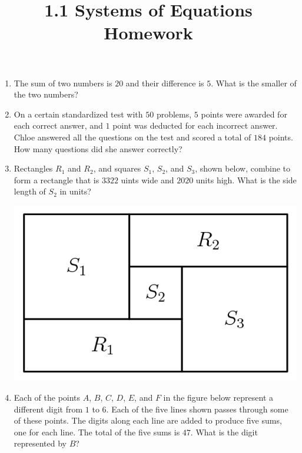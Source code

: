 \documentclass{article}
\title{1.1 Systems of Equations Homework}
\author{}
\date{}
\begin{document}
\maketitle
\begin{enumerate}
    \item The sum of two numbers is $20$ and their difference is $5$.
        What is the smaller of the two numbers?
        \vspace{3cm}
    \item On a certain standardized test with $50$ problems, $5$ points were awarded for each correct answer, and $1$ point was deducted for each incorrect answer.
        Chloe answered all the questions on the test and scored a total of $184$ points.
        How many questions did she answer correctly?
        \vspace{3cm}
    \item Rectangles $R_1$ and $R_2$, and squares $S_1$, $S_2$, and $S_3$, shown below, combine to form a rectangle that is $3322$ uints wide and $2020$ units high.
        What is the side length of $S_2$ in units?
        \begin{center}
            \includegraphics[scale=0.2]{1-1rectangles.png}
        \end{center}
        \vspace{3cm}
    \item Each of the points $A$, $B$, $C$, $D$, $E$, and $F$ in the figure below represent a different digit from $1$ to $6$.
        Each of the five lines shown passes through some of these points.
        The digits along each line are added to produce five sums, one for each line.
        The total of the five sums is $47$.
        What is the digit represented by $B$?
        \begin{center}

\end{center}
\end{enumerate}
\end{document}

